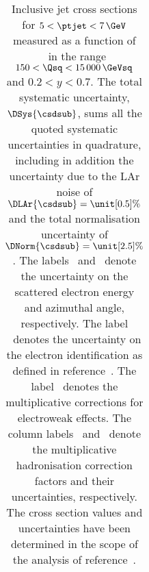 \documentclass[12pt]{article}
\begin{document}
\begin{table}
\begin{tabular}{c c r r r c c c c c | c c c}
\end{tabular}
    \caption{
      Inclusive jet cross sections for $5<\ptjet<7\,\GeV$ measured as a function of \Qsq\ in the range $150<\Qsq<15\,000\,\GeVsq$ and $0.2<y<0.7$.
      The total systematic uncertainty, $\DSys{\csdsub}$, sums all the quoted systematic uncertainties in quadrature, including in addition the uncertainty due to the LAr noise of $\DLAr{\csdsub} = \unit[0.5]{\%}$ and the total normalisation uncertainty of $\DNorm{\csdsub} =\unit[2.5]{\%}$. The labels \DEe\ and \DThe\  denote the uncertainty on the scattered electron energy and azimuthal angle, respectively. The label \DID\ denotes the uncertainty on the electron identification as defined in reference~\cite{H1Multijets}. The label \cEW\ denotes the multiplicative corrections for electroweak effects.
      The column labels \cHad\ and \DHad\ denote the multiplicative hadronisation correction factors and their uncertainties, respectively.
      The cross section values and uncertainties have been determined in the scope of the analysis of reference~\cite{H1Multijets}.
    }
  \label{tab:IncJetHQ}
\end{table}
\end{document}
